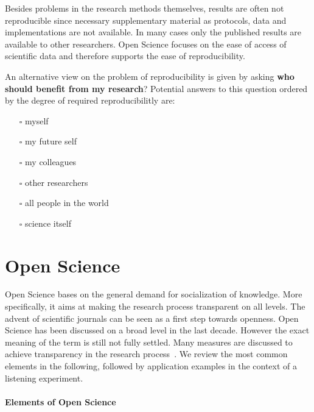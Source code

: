 \documentclass[a4paper, 10pt, twocolumn]{article}
\begin{document}
Besides problems in the research methods themselves, results are often not reproducible since 
necessary supplementary material as protocols, data and implementations are not available. In 
many cases only the published results are available to other researchers. Open Science 
focuses on the ease of access of scientific data and therefore supports the ease of 
reproducibility.

An alternative view on the problem of reproducibility is given by asking 
\textbf{who should benefit from my research}? Potential answers to this question ordered by 
the degree of required reproducibilitly are:
\begin{itemize}
\item[$\square$] myself
\item[$\square$] my future self
\item[$\square$] my colleagues
\item[$\square$] other researchers
\item[$\square$] all people in the world
\item[$\square$] science itself
\end{itemize}


\section*{Open Science} \label{sec:open_science} 

Open Science bases on the general demand for socialization of knowledge. More specifically, 
it aims at making the research process transparent on all levels. The advent of scientific 
journals can be seen as a first step towards openness. Open Science has been discussed on
a broad level in the last decade. However the exact meaning of the term is still not fully 
settled. Many measures are discussed to achieve transparency in the research process~\cite{Pontika15:ACM,Reproducibility15:AMS,Albagli15:Book,Vrana15:MIPRO,Kraker11:TEL}. 
We review the most common elements in the following, followed by application examples in
the context of a listening experiment.


\paragraph*{Elements of Open Science}
\end{document}
